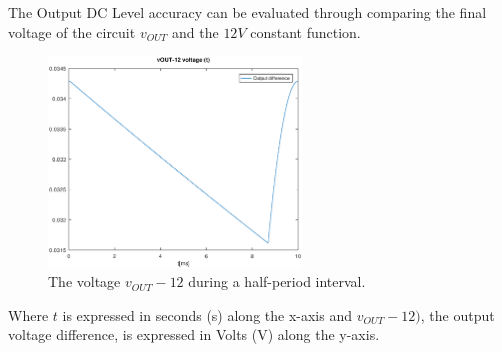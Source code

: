 The Output DC Level accuracy can be evaluated through comparing the final voltage of the circuit $v_{OUT}$ and the $12 V$ constant function. 

\begin{figure}[H] \centering
\includegraphics[width=0.6\textwidth]{outputdiff.eps}
\caption{The voltage $v_{OUT}-12$ during a half-period interval.}
\label{fig:outputdiff}
\end{figure}

Where $t$ is expressed in seconds (s) along the x-axis and 
$v_{OUT}-12)$, the output voltage difference, is expressed in Volts (V) along the y-axis.
